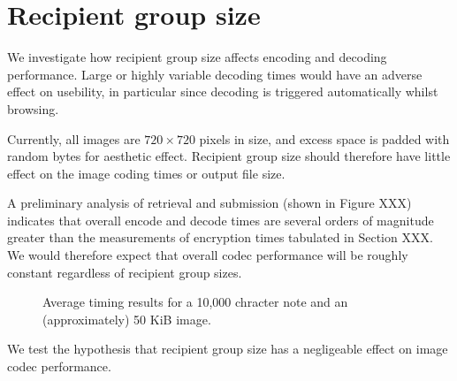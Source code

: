 \FloatBarrier
\section{Recipient group size}

We investigate how recipient group size affects encoding and decoding performance. Large or highly variable decoding times would have an adverse effect on usebility, in particular since decoding is triggered automatically whilst browsing.

Currently, all images are $720 \times 720$ pixels in size, and excess space is padded with random bytes for aesthetic effect. Recipient group size should therefore have little effect on the image coding times or output file size.

A preliminary analysis of retrieval and submission (shown in Figure XXX) indicates that overall encode and decode times are several orders of magnitude greater than the measurements of encryption times tabulated in Section XXX. We would therefore expect that overall codec performance will be roughly constant regardless of recipient group sizes.

\begin{figure}[tbph]
    \begin{center}
    \caption{Average timing results for a 10,000 chracter note and an (approximately) 50 KiB image.}
    \label{graph:txt-sync}
  \end{center}
\end{figure}

We test the hypothesis that recipient group size has a negligeable effect on image codec performance.


